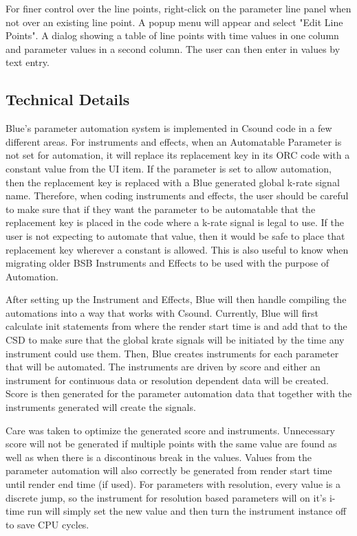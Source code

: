 For finer control over the line points, right-click on the parameter
line panel when not over an existing line point. A popup menu will
appear and select "Edit Line Points". A dialog showing a table of line
points with time values in one column and parameter values in a second
column. The user can then enter in values by text entry.

\subsection{Technical Details}

Blue's parameter automation system is implemented in Csound code in a
few different areas. For instruments and effects, when an Automatable
Parameter is not set for automation, it will replace its replacement key
in its ORC code with a constant value from the UI item. If the parameter
is set to allow automation, then the replacement key is replaced with a
Blue generated global k-rate signal name. Therefore, when coding
instruments and effects, the user should be careful to make sure that if
they want the parameter to be automatable that the replacement key is
placed in the code where a k-rate signal is legal to use. If the user is
not expecting to automate that value, then it would be safe to place
that replacement key wherever a constant is allowed. This is also useful
to know when migrating older BSB Instruments and Effects to be used with
the purpose of Automation.

After setting up the Instrument and Effects, Blue will then handle
compiling the automations into a way that works with Csound. Currently,
Blue will first calculate init statements from where the render start
time is and add that to the CSD to make sure that the global krate
signals will be initiated by the time any instrument could use them.
Then, Blue creates instruments for each parameter that will be
automated. The instruments are driven by score and either an instrument
for continuous data or resolution dependent data will be created. Score
is then generated for the parameter automation data that together with
the instruments generated will create the signals.

Care was taken to optimize the generated score and instruments.
Unnecessary score will not be generated if multiple points with the same
value are found as well as when there is a discontinous break in the
values. Values from the parameter automation will also correctly be
generated from render start time until render end time (if used). For
parameters with resolution, every value is a discrete jump, so the
instrument for resolution based parameters will on it's i-time run will
simply set the new value and then turn the instrument instance off to
save CPU cycles.

